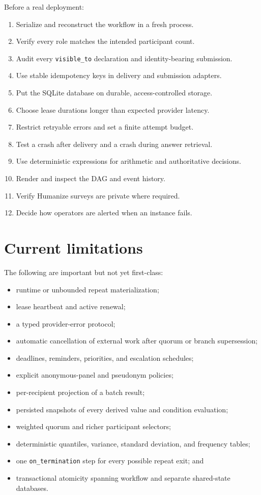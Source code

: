 \documentclass[
  10pt,
]{report}
\providecommand{\tightlist}{%
  \setlength{\itemsep}{0pt}\setlength{\parskip}{0pt}}
\begin{document}
Before a real deployment:

\begin{enumerate}
\def\labelenumi{\arabic{enumi}.}
\tightlist
\item
  Serialize and reconstruct the workflow in a fresh process.
\item
  Verify every role matches the intended participant count.
\item
  Audit every \texttt{visible\_to} declaration and identity-bearing
  submission.
\item
  Use stable idempotency keys in delivery and submission adapters.
\item
  Put the SQLite database on durable, access-controlled storage.
\item
  Choose lease durations longer than expected provider latency.
\item
  Restrict retryable errors and set a finite attempt budget.
\item
  Test a crash after delivery and a crash during answer retrieval.
\item
  Use deterministic expressions for arithmetic and authoritative
  decisions.
\item
  Render and inspect the DAG and event history.
\item
  Verify Humanize surveys are private where required.
\item
  Decide how operators are alerted when an instance fails.
\end{enumerate}

\chapter{Current limitations}\label{current-limitations}

The following are important but not yet first-class:

\begin{itemize}
\tightlist
\item
  runtime or unbounded repeat materialization;
\item
  lease heartbeat and active renewal;
\item
  a typed provider-error protocol;
\item
  automatic cancellation of external work after quorum or branch
  supersession;
\item
  deadlines, reminders, priorities, and escalation schedules;
\item
  explicit anonymous-panel and pseudonym policies;
\item
  per-recipient projection of a batch result;
\item
  persisted snapshots of every derived value and condition evaluation;
\item
  weighted quorum and richer participant selectors;
\item
  deterministic quantiles, variance, standard deviation, and frequency
  tables;
\item
  one \texttt{on\_termination} step for every possible repeat exit; and
\item
  transactional atomicity spanning workflow and separate shared-state
  databases.
\end{itemize}
\end{document}
